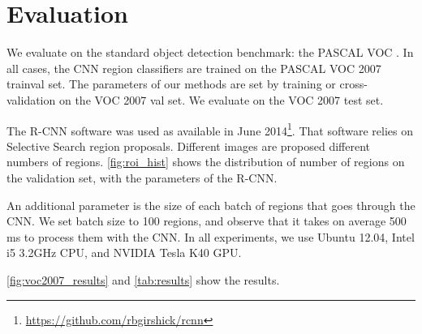 \section{Evaluation}\label{sec:evaluation}

We evaluate on the standard object detection benchmark: the PASCAL VOC .
In all cases, the CNN region classifiers are trained on the PASCAL VOC 2007 trainval set.
The parameters of our methods are set by training or cross-validation on the VOC 2007 val set.
We evaluate on the VOC 2007 test set.

The R-CNN software was used as available in June 2014\footnote{\url{https://github.com/rbgirshick/rcnn}}.
That software relies on Selective Search \cite{Uijlings-IJCV-2013} region proposals.
Different images are proposed different numbers of regions.
\autoref{fig:roi_hist} shows the distribution of number of regions on the validation set, with the parameters of the R-CNN.

An additional parameter is the size of each batch of regions that goes through the CNN.
We set batch size to 100 regions, and observe that it takes on average 500 ms to process them with the CNN.
In all experiments, we use Ubuntu 12.04, Intel i5 3.2GHz CPU, and NVIDIA Tesla K40 GPU.

\autoref{fig:voc2007_results} and \autoref{tab:results} show the results.

